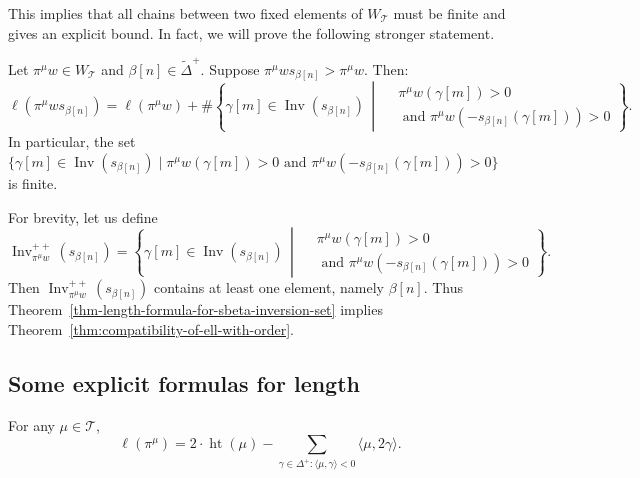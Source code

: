 \documentclass[ALCO,ThmDefs,Unicode]{cedram}
\DeclareMathOperator{\height}{ht}
\DeclareMathOperator{\Inv}{Inv}
\newcommand{\cT}{\mathcal{T}}
\newcommand{\suchthat}{\mid}
\newcommand{\WTits}{W_{\TitsCone}}
\newcommand{\TitsCone}{\cT}
\newcommand{\textand}{\text{ and }}
\newcommand{\tDelta}{\widetilde{\Delta}}
\begin{document}
This implies that all chains between two fixed elements of $\WTits$ must be finite and gives an explicit bound. In fact, we will prove the following stronger statement.
\begin{theo}\label{thm-length-formula-for-sbeta-inversion-set}
Let $\pi^\mu w \in \WTits$ and $\beta[n]\in\tDelta^+$. Suppose $\pi^\mu w s_{\beta[n]} > \pi^\mu w$. Then:
\begin{equation}
\ell(\pi^\mu w s_{\beta[n]}) = \ell(\pi^\mu w) + \#\! \left\{ \gamma[m] \in \Inv(s_{\beta[n]}) \,\middle|\,
\begin{aligned}
&\pi^\mu w(\gamma[m]) > 0 \\& \textand \pi^\mu w(-s_{\beta[n]}(\gamma[m])) > 0 
\end{aligned} \right\}\!.
\end{equation}
In particular, the set $\{ \gamma[m] \in \Inv(s_{\beta[n]}) \!\suchthat\! \pi^\mu w(\gamma[m]) > 0 \textand \pi^\mu w(-s_{\beta[n]}(\gamma[m])) > 0 \} $ is finite.
\end{theo}

For brevity, let us define
\begin{equation}
\Inv^{++}_{\pi^\mu w }(s_{\beta[n]}) = \left\{\gamma[m] \in \Inv(s_{\beta[n]}) \,\middle|\,
\begin{aligned}
&\pi^\mu w(\gamma[m]) > 0 \\ &\textand \pi^\mu w(-s_{\beta[n]}(\gamma[m])) > 0 \end{aligned}\right\}\!.
\end{equation}
Then $\Inv^{++}_{\pi^\mu w}(s_{\beta[n]})$ contains at least one element, namely $\beta[n]$. Thus Theorem~\ref{thm-length-formula-for-sbeta-inversion-set} implies Theorem~\ref{thm:compatibility-of-ell-with-order}.

\subsection{Some explicit formulas for length}

\begin{prop}\label{prop-height-formula}
For any $\mu\in\TitsCone$,
\begin{equation}\label{eq:15}
\ell(\pi^\mu) = 2 \cdot \height(\mu) - \sum_{\gamma\in\Delta^+: \langle \mu, \gamma \rangle < 0} \langle \mu, 2\gamma \rangle.
\end{equation}
\end{prop}
\end{document}
